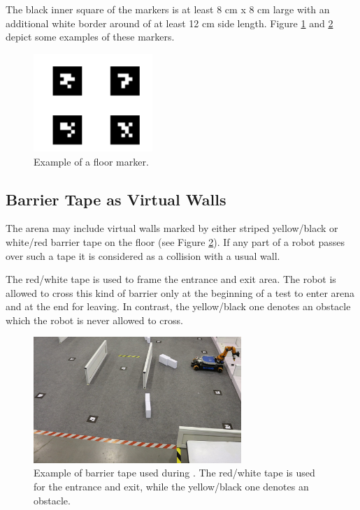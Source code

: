 The black inner square of the markers is at least 8 cm x 8 cm large with an additional white border around of at least 12 cm side length. Figure \ref{fig:floor_marker} and \ref{fig:barrier_tape} depict some examples of these markers.

\begin{figure} [h!]
\centering
\includegraphics[width= 0.4\textwidth ]{./images/example_floor_marker.png}
\caption{Example of a floor marker.}
\label{fig:floor_marker}
\end{figure}



\subsection{Barrier Tape as Virtual Walls}
The arena may include virtual walls marked by either striped yellow/black or white/red barrier tape on the floor (see Figure \ref{fig:barrier_tape}). If any part of a robot passes over such a tape it is considered as a collision with a usual wall.

The red/white tape is used to frame the entrance and exit area. The robot is allowed to cross this kind of barrier only at the beginning of a test to enter arena and at the end for leaving. In contrast, the yellow/black one denotes an obstacle which the robot is never allowed to cross. 

\begin{figure} [h!]
\centering
\includegraphics[width= 0.7\textwidth ]{./images/barrier_tapes_in_china15.jpg}
\caption{Example of barrier tape used during . The red/white tape is used for the entrance and exit, while the yellow/black one denotes an obstacle.}
\label{fig:barrier_tape}
\end{figure}


